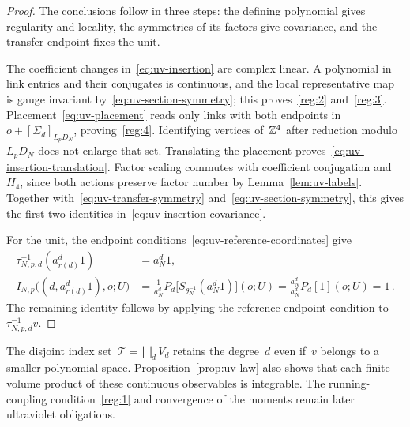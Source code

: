 \begin{proof}
The conclusions follow in three steps: the defining polynomial gives regularity and locality, the symmetries of its factors give covariance, and the transfer endpoint fixes the unit.


The coefficient changes in~\eqref{eq:uv-insertion} are complex linear.
A polynomial in link entries and their conjugates is continuous, and the local representative map is gauge invariant by~\eqref{eq:uv-section-symmetry}; this proves~\ref{reg:2} and~\ref{reg:3}.
Placement~\eqref{eq:uv-placement} reads only links with both endpoints in~$o+[\Sigma_d]_{L_pD_N}$, proving~\ref{reg:4}.
Identifying vertices of~$\mathbb Z^4$ after reduction modulo~$L_pD_N$ does not enlarge that set.
Translating the placement proves~\eqref{eq:uv-insertion-translation}.
Factor scaling commutes with coefficient conjugation and~$H_4$, since both actions preserve factor number by Lemma~\ref{lem:uv-labels}.
Together with~\eqref{eq:uv-transfer-symmetry} and~\eqref{eq:uv-section-symmetry}, this gives the first two identities in~\eqref{eq:uv-insertion-covariance}.

For the unit, the endpoint conditions~\eqref{eq:uv-reference-coordinates} give
\begin{equation}\label{eq:uv-unit-calculation}
 \begin{aligned}
 \tau_{N,p,d}^{-1}(a_{r(d)}^d1)&=a_N^d1,\\
 I_{N,p}\bigl((d,a_{r(d)}^d1),o;U\bigr)
 &=\frac{1}{a_N^d}P_d\bigl[S_{\theta_N^{-1}}(a_N^d1)\bigr](o;U)
 =\frac{a_N^d}{a_N^d}P_d[1](o;U)=1\,.
 \end{aligned}
\end{equation}
The remaining identity follows by applying the reference endpoint condition to~$\tau_{N,p,d}^{-1}v$.
\end{proof}

The disjoint index set~$\mathcal T=\bigsqcup_dV_d$ retains the degree~$d$ even if~$v$ belongs to a smaller polynomial space. Proposition~\ref{prop:uv-law} also shows that each finite-volume product of these continuous observables is integrable. The running-coupling condition~\ref{reg:1} and convergence of the moments remain later ultraviolet obligations.

